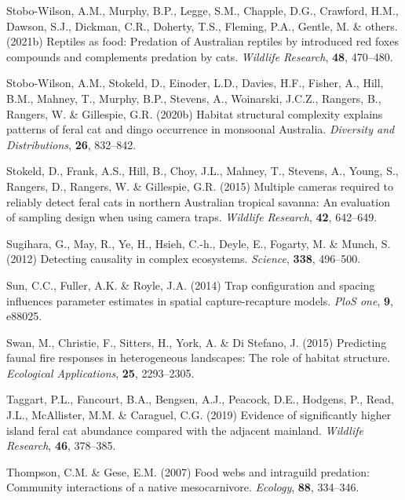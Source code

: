 \documentclass[11pt,a4paper,titlepage,twoside,openright]{style/unimelbthesis}
\begin{document}
\begin{mainmatter}
\leavevmode\hypertarget{ref-stobo2021reptiles}{}%
Stobo-Wilson, A.M., Murphy, B.P., Legge, S.M., Chapple, D.G., Crawford, H.M., Dawson, S.J., Dickman, C.R., Doherty, T.S., Fleming, P.A., Gentle, M. \& others. (2021b) Reptiles as food: Predation of Australian reptiles by introduced red foxes compounds and complements predation by cats. \emph{Wildlife Research}, \textbf{48}, 470--480.

\leavevmode\hypertarget{ref-stobo2020habitat}{}%
Stobo-Wilson, A.M., Stokeld, D., Einoder, L.D., Davies, H.F., Fisher, A., Hill, B.M., Mahney, T., Murphy, B.P., Stevens, A., Woinarski, J.C.Z., Rangers, B., Rangers, W. \& Gillespie, G.R. (2020b) Habitat structural complexity explains patterns of feral cat and dingo occurrence in monsoonal Australia. \emph{Diversity and Distributions}, \textbf{26}, 832--842.

\leavevmode\hypertarget{ref-stokeld2015multiple}{}%
Stokeld, D., Frank, A.S., Hill, B., Choy, J.L., Mahney, T., Stevens, A., Young, S., Rangers, D., Rangers, W. \& Gillespie, G.R. (2015) Multiple cameras required to reliably detect feral cats in northern Australian tropical savanna: An evaluation of sampling design when using camera traps. \emph{Wildlife Research}, \textbf{42}, 642--649.

\leavevmode\hypertarget{ref-sugihara2012detecting}{}%
Sugihara, G., May, R., Ye, H., Hsieh, C.-h., Deyle, E., Fogarty, M. \& Munch, S. (2012) Detecting causality in complex ecosystems. \emph{Science}, \textbf{338}, 496--500.

\leavevmode\hypertarget{ref-sun2014trap}{}%
Sun, C.C., Fuller, A.K. \& Royle, J.A. (2014) Trap configuration and spacing influences parameter estimates in spatial capture-recapture models. \emph{PloS one}, \textbf{9}, e88025.

\leavevmode\hypertarget{ref-swan2015predicting}{}%
Swan, M., Christie, F., Sitters, H., York, A. \& Di Stefano, J. (2015) Predicting faunal fire responses in heterogeneous landscapes: The role of habitat structure. \emph{Ecological Applications}, \textbf{25}, 2293--2305.

\leavevmode\hypertarget{ref-taggart2019evidence}{}%
Taggart, P.L., Fancourt, B.A., Bengsen, A.J., Peacock, D.E., Hodgens, P., Read, J.L., McAllister, M.M. \& Caraguel, C.G. (2019) Evidence of significantly higher island feral cat abundance compared with the adjacent mainland. \emph{Wildlife Research}, \textbf{46}, 378--385.

\leavevmode\hypertarget{ref-thompson2007food}{}%
Thompson, C.M. \& Gese, E.M. (2007) Food webs and intraguild predation: Community interactions of a native mesocarnivore. \emph{Ecology}, \textbf{88}, 334--346.


\end{mainmatter}
\end{document}
